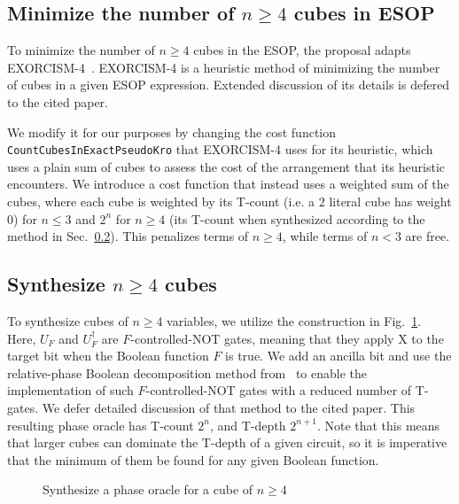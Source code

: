 \subsection{Minimize the number of $n \geq 4$ cubes in ESOP}
\label{Pro:Minimize}

To minimize the number of $n \geq 4$ cubes in the ESOP, the proposal adapts EXORCISM-4~\cite{bib-exorcism}.
EXORCISM-4 is a heuristic method of minimizing the number of cubes in a given ESOP expression. Extended
discussion of its details is defered to the cited paper. 

We modify it for our purposes by changing
the cost function \texttt{CountCubesInExactPseudoKro} that EXORCISM-4 uses for its heuristic, which uses a plain sum
of cubes to assess the cost of the arrangement that its heuristic encounters. We introduce a cost function
that instead uses a weighted sum of the cubes, where each cube is weighted by its T-count (i.e. a 2 literal cube
has weight 0) for $n \leq 3$ and $2^n$ for $n \geq 4$ (its T-count when synthesized according to the method in
Sec.~\ref{Pro:n4}). This penalizes terms of $n \geq 4$, while terms of $n < 3$ are free.


\subsection{Synthesize $n \geq 4$ cubes}
\label{Pro:n4}

To synthesize cubes of $n \geq 4$ variables, we utilize the construction in Fig.~\ref{fig-phase-n4}. Here,
$U_F$ and $U_F^{\dagger}$ are $F$-controlled-NOT gates, meaning that they apply X to the target bit when
the Boolean function $F$ is true. We add an ancilla bit and use the relative-phase Boolean decomposition
method from~\cite{bib-clarino-lut} to enable the implementation of such $F$-controlled-NOT gates with a
reduced number of T-gates. We defer detailed discussion of that method to the cited paper. This resulting
phase oracle has T-count $2^{n}$, and T-depth $2^{n+1}$. Note that this means that larger cubes can
dominate the T-depth of a given circuit, so it is imperative that the minimum of them be found for
any given Boolean function.

\begin{figure}[t]
  \centering
  \scalebox{1.0} {
    
  }
  \caption{Synthesize a phase oracle for a cube of $n \geq 4$}
  \label{fig-phase-n4}
  \vspace{-0.5cm}
\end{figure}

